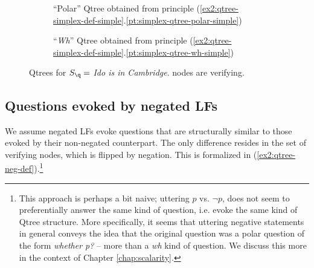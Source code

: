 	\begin{figure}[H]
		\centering
		\begin{subfigure}[b]{.3\linewidth}
			\centering
			\scalebox{1}{
				\begin{forest}
					[CS [\fbox{$\q$}][$\neg \q$]]
				\end{forest}
			}
			\caption{``Polar'' Qtree obtained from principle (\ref{ex2:qtree-simplex-def-simple}.\ref{pt:simplex-qtree-polar-simple})}\label{fig2:qtree-q-polar}
		\end{subfigure}\qquad
		\begin{subfigure}[b]{.3\linewidth}
			\centering
			\scalebox{1}{
				\begin{forest}
					[CS [$\p$][\fbox{$\q$}][$\r$][...]]
				\end{forest}
			}
			\caption{``\textit{Wh}'' Qtree obtained from principle (\ref{ex2:qtree-simplex-def-simple}.\ref{pt:simplex-qtree-wh-simple})}\label{fig2:qtree-q-wh}
		\end{subfigure}
		\caption{Qtrees for $S\protect_{\q}=$ \textit{Ido is in Cambridge}. \setlength{\fboxsep}{1pt} nodes are verifying.}
		\label{fig2:qtrees-q}
	\end{figure}



\subsection{Questions evoked by negated LFs}\label{sec:neg}
We assume negated LFs evoke questions that are structurally similar to those evoked by their non-negated counterpart. The only difference resides in the set of verifying nodes, which is flipped by negation. This is formalized in (\ref{ex2:qtree-neg-def}).\footnote{This approach is perhaps a bit naive; uttering $p$ vs. $\neg p$, does not seem to preferentially answer the same kind of question, i.e. evoke the same kind of Qtree structure. More specifically, it seems that uttering negative statements in general conveys the idea that the original question was a polar question of the form \textit{whether p?} -- more than a \textit{wh} kind of question. We discuss this more in the context of Chapter \ref{chap:scalarity}.}

